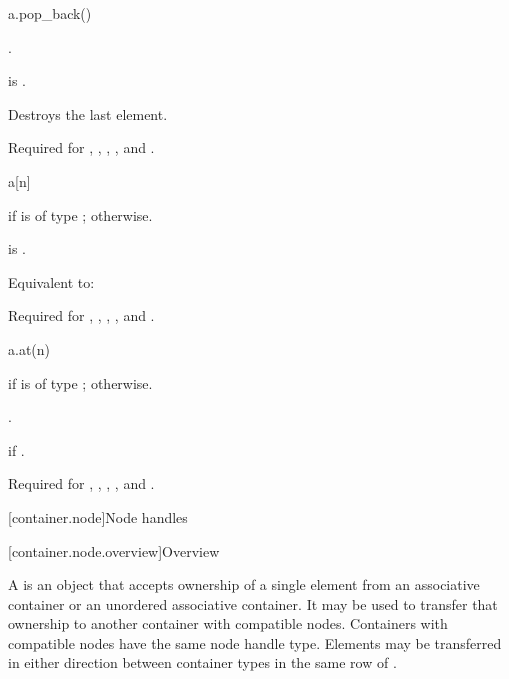 \begin{itemdecl}
a.pop_back()
\end{itemdecl}

\begin{itemdescr}
\pnum
\result
{}.

\pnum
\hardexpects
{} is .

\pnum
\effects
Destroys the last element.

\pnum
\remarks
Required for
,
,
,
, and
.
\end{itemdescr}

\begin{itemdecl}
a[n]
\end{itemdecl}

\begin{itemdescr}
\pnum
\result
{} if  is of type ;
 otherwise.

\pnum
\hardexpects
{} is .

\pnum
\effects
Equivalent to: 

\pnum
\remarks
Required for
,
,
,
, and
.
\end{itemdescr}

\begin{itemdecl}
a.at(n)
\end{itemdecl}

\begin{itemdescr}
\pnum
\result
{} if  is of type ;
 otherwise.

\pnum
\returns
{}.

\pnum
\throws
{} if .

\pnum
\remarks
Required for
,
,
,
, and
.
\end{itemdescr}

[container.node]{Node handles}

[container.node.overview]{Overview}

\pnum
A  is an object that accepts ownership of a single element
from an associative container or an unordered
associative container. It may be used to transfer that
ownership to another container with compatible nodes.  Containers with
compatible nodes have the same node handle type. Elements may be transferred in
either direction between container types in the same row of
.

